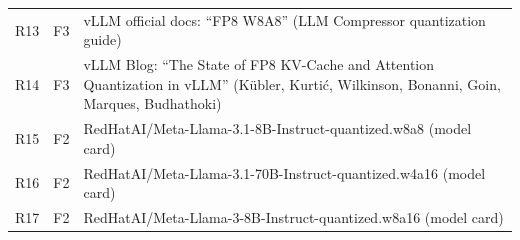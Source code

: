 \begin{table}[!t]
\begin{tabular}{@{}llp{10.2cm}@{}}
R13 & F3 & vLLM official docs: ``FP8 W8A8'' (LLM Compressor quantization guide) \\
R14 & F3 & vLLM Blog: ``The State of FP8 KV-Cache and Attention Quantization in vLLM'' (Kübler, Kurtić, Wilkinson, Bonanni, Goin, Marques, Budhathoki) \\
R15 & F2 & RedHatAI/Meta-Llama-3.1-8B-Instruct-quantized.w8a8 (model card) \\
R16 & F2 & RedHatAI/Meta-Llama-3.1-70B-Instruct-quantized.w4a16 (model card) \\
R17 & F2 & RedHatAI/Meta-Llama-3-8B-Instruct-quantized.w8a16 (model card) \\
\bottomrule
\end{tabular}
\end{table}

